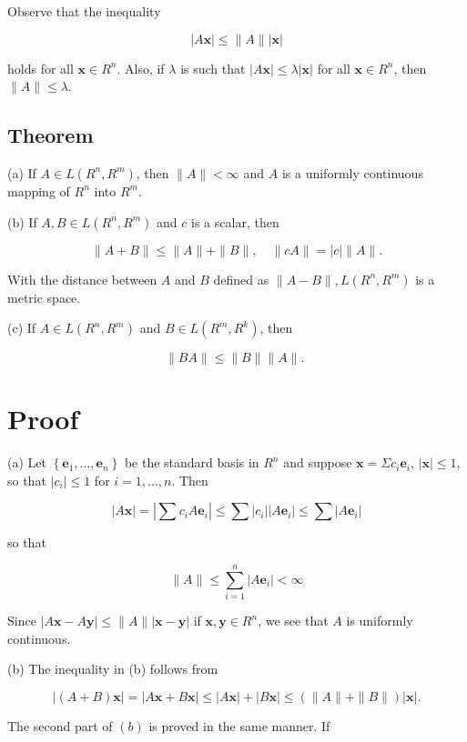 \documentclass[10pt]{article}
\begin{document}
Observe that the inequality

$$
|A \mathbf{x}| \leq\|A\||\mathbf{x}|
$$

holds for all $\mathbf{x} \in R^{n}$. Also, if $\lambda$ is such that $|A \mathbf{x}| \leq \lambda|\mathbf{x}|$ for all $\mathbf{x} \in R^{n}$, then $\|A\| \leq \lambda$.

\subsection{Theorem}
(a) If $A \in L\left(R^{n}, R^{m}\right)$, then $\|A\|<\infty$ and $A$ is a uniformly continuous mapping of $R^{n}$ into $R^{m}$.

(b) If $A, B \in L\left(R^{n}, R^{m}\right)$ and $c$ is a scalar, then

$$
\|A+B\| \leq\|A\|+\|B\|, \quad\|c A\|=|c|\|A\| .
$$

With the distance between $A$ and $B$ defined as $\|A-B\|, L\left(R^{n}, R^{m}\right)$ is a metric space.

(c) If $A \in L\left(R^{n}, R^{m}\right)$ and $B \in L\left(R^{m}, R^{k}\right)$, then

$$
\|B A\| \leq\|B\|\|A\| \text {. }
$$

\section{Proof}
(a) Let $\left\{\mathbf{e}_{1}, \ldots, \mathbf{e}_{n}\right\}$ be the standard basis in $R^{n}$ and suppose $\mathbf{x}=\Sigma c_{i} \mathbf{e}_{i}$, $|\mathbf{x}| \leq 1$, so that $\left|c_{i}\right| \leq 1$ for $i=1, \ldots, n$. Then

$$
|A \mathbf{x}|=\left|\sum c_{i} A \mathbf{e}_{i}\right| \leq \sum\left|c_{i}\right|\left|A \mathbf{e}_{i}\right| \leq \sum\left|A \mathbf{e}_{i}\right|
$$

so that

$$
\|A\| \leq \sum_{i=1}^{n}\left|A \mathbf{e}_{i}\right|<\infty
$$

Since $|A \mathbf{x}-A \mathbf{y}| \leq\|A\||\mathbf{x}-\mathbf{y}|$ if $\mathbf{x}, \mathbf{y} \in R^{n}$, we see that $A$ is uniformly continuous.

(b) The inequality in (b) follows from

$$
|(A+B) \mathbf{x}|=|A \mathbf{x}+B \mathbf{x}| \leq|A \mathbf{x}|+|B \mathbf{x}| \leq(\|A\|+\|B\|)|\mathbf{x}| .
$$

The second part of $(b)$ is proved in the same manner. If
\end{document}
